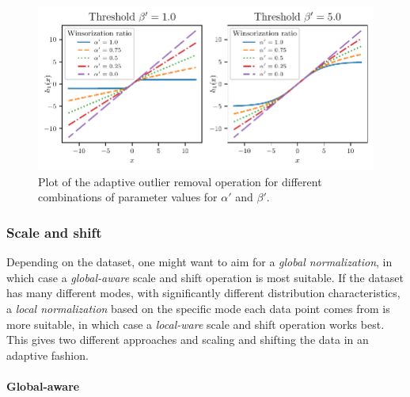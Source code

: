 \documentclass{statsmsc}
\begin{document}
{\begin{figure}
\begin{center}
    \includegraphics[width=\textwidth]{figures/adaptive_outlier_removal.pdf}
\end{center}
\caption{Plot of the adaptive outlier removal operation for different combinations of parameter
values for $\alpha'$ and $\beta'$.}
\label{fig:adaptive_outlier}
\end{figure}



\subsubsection{Scale and shift}%
\label{ssub:Scale and shift}

Depending on the dataset, one might want to aim for a \textit{global
normalization}, in which case a \textit{global-aware} scale and shift operation is most
suitable. If the dataset has many different modes, with significantly different distribution characteristics, a \textit{local normalization} based on the specific mode each data point comes from is more suitable, in which case a \textit{local-ware} scale and shift
operation works best. This gives two different approaches and scaling and shifting the data in an adaptive fashion.

\paragraph{Global-aware}%
\label{par:Global-aware}

}
\end{document}
